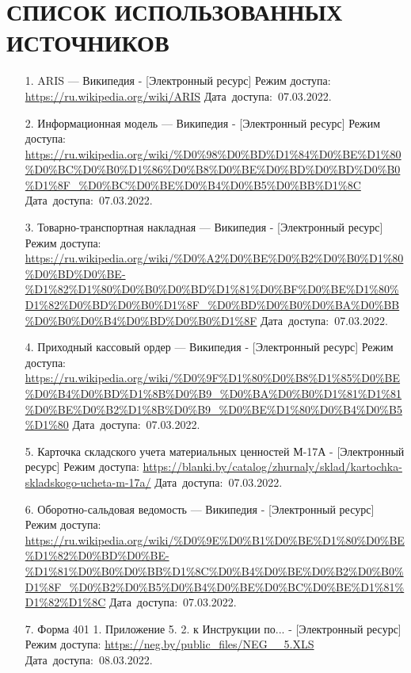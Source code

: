 \documentclass[12pt, a4paper, simple]{eskdtext}
\begin{document}
    \section*{СПИСОК ИСПОЛЬЗОВАННЫХ ИСТОЧНИКОВ}
    \begin{enumerate}    
        \item[1.] ARIS — Википедия
        - [Электронный ресурс]
        Режим доступа: \url{https://ru.wikipedia.org/wiki/ARIS}
        Дата~доступа:~07.03.2022.
        \item[2.] Информационная модель — Википедия
        - [Электронный ресурс]
        Режим доступа: \url{https://ru.wikipedia.org/wiki/%D0%98%D0%BD%D1%84%D0%BE%D1%80%D0%BC%D0%B0%D1%86%D0%B8%D0%BE%D0%BD%D0%BD%D0%B0%D1%8F_%D0%BC%D0%BE%D0%B4%D0%B5%D0%BB%D1%8C}
        Дата~доступа:~07.03.2022.
        \item[3.] Товарно-транспортная накладная — Википедия
        - [Электронный ресурс]
        Режим доступа: \url{https://ru.wikipedia.org/wiki/%D0%A2%D0%BE%D0%B2%D0%B0%D1%80%D0%BD%D0%BE-%D1%82%D1%80%D0%B0%D0%BD%D1%81%D0%BF%D0%BE%D1%80%D1%82%D0%BD%D0%B0%D1%8F_%D0%BD%D0%B0%D0%BA%D0%BB%D0%B0%D0%B4%D0%BD%D0%B0%D1%8F}
        Дата~доступа:~07.03.2022.
        \item[4.] Приходный кассовый ордер — Википедия
        - [Электронный ресурс]
        Режим доступа: \url{https://ru.wikipedia.org/wiki/%D0%9F%D1%80%D0%B8%D1%85%D0%BE%D0%B4%D0%BD%D1%8B%D0%B9_%D0%BA%D0%B0%D1%81%D1%81%D0%BE%D0%B2%D1%8B%D0%B9_%D0%BE%D1%80%D0%B4%D0%B5%D1%80}
        Дата~доступа:~07.03.2022.
        \item[5.] Карточка складского учета материальных ценностей М-17А 
        - [Электронный ресурс]
        Режим доступа: \url{https://blanki.by/catalog/zhurnaly/sklad/kartochka-skladskogo-ucheta-m-17a/}
        Дата~доступа:~07.03.2022.
        \item[6.] Оборотно-сальдовая ведомость — Википедия
        - [Электронный ресурс]
        Режим доступа: \url{https://ru.wikipedia.org/wiki/%D0%9E%D0%B1%D0%BE%D1%80%D0%BE%D1%82%D0%BD%D0%BE-%D1%81%D0%B0%D0%BB%D1%8C%D0%B4%D0%BE%D0%B2%D0%B0%D1%8F_%D0%B2%D0%B5%D0%B4%D0%BE%D0%BC%D0%BE%D1%81%D1%82%D1%8C}
        Дата~доступа:~07.03.2022.
        \item[7.] Форма 401 1. Приложение 5. 2. к Инструкции по...
        - [Электронный ресурс]
        Режим доступа: \url{https://neg.by/public_files/NEG__5.XLS}
        Дата~доступа:~08.03.2022.
    \end{enumerate}
    \newpage

    \newpage
\end{document}
